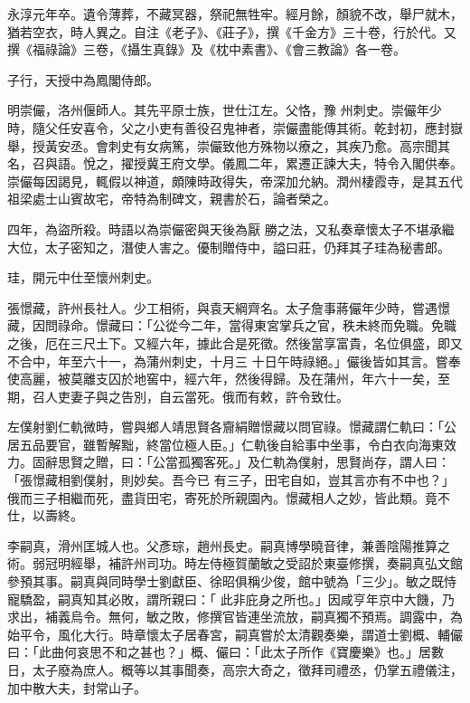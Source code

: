 \begin{pinyinscope}
 永淳元年卒。遺令薄葬，不藏冥器，祭祀無牲牢。經月餘，顏貌不改，舉尸就木，猶若空衣，時人異之。自注《老子》、《莊子》，撰《千金方》三十卷，行於代。又撰《福祿論》三卷，《攝生真錄》及《枕中素書》、《會三教論》各一卷。



 子行，天授中為鳳閣侍郎。



 明崇儼，洛州偃師人。其先平原士族，世仕江左。父恪，豫
 州刺史。崇儼年少時，隨父任安喜令，父之小吏有善役召鬼神者，崇儼盡能傳其術。乾封初，應封嶽舉，授黃安丞。會刺史有女病篤，崇儼致他方殊物以療之，其疾乃愈。高宗聞其名，召與語。悅之，擢授冀王府文學。儀鳳二年，累遷正諫大夫，特令入閣供奉。崇儼每因謁見，輒假以神道，頗陳時政得失，帝深加允納。潤州棲霞寺，是其五代祖梁處士山賓故宅，帝特為制碑文，親書於石，論者榮之。



 四年，為盜所殺。時語以為崇儼密與天後為厭
 勝之法，又私奏章懷太子不堪承繼大位，太子密知之，潛使人害之。優制贈侍中，謚曰莊，仍拜其子珪為秘書郎。



 珪，開元中仕至懷州刺史。



 張憬藏，許州長社人。少工相術，與袁天綱齊名。太子詹事蔣儼年少時，嘗遇憬藏，因問祿命。憬藏曰：「公從今二年，當得東宮掌兵之官，秩未終而免職。免職之後，厄在三尺土下。又經六年，據此合是死徵。然後當享富貴，名位俱盛，即又不合中，年至六十一，為蒲州刺史，十月三
 十日午時祿絕。」儼後皆如其言。嘗奉使高麗，被莫離支囚於地窖中，經六年，然後得歸。及在蒲州，年六十一矣，至期，召人吏妻子與之告別，自云當死。俄而有敕，許令致仕。



 左僕射劉仁軌微時，嘗與鄉人靖思賢各齎絹贈憬藏以問官祿。憬藏謂仁軌曰：「公居五品要官，雖暫解黜，終當位極人臣。」仁軌後自給事中坐事，令白衣向海東效力。固辭思賢之贈，曰：「公當孤獨客死。」及仁軌為僕射，思賢尚存，謂人曰：「張憬藏相劉僕射，則妙矣。吾今已
 有三子，田宅自如，豈其言亦有不中也？」俄而三子相繼而死，盡貨田宅，寄死於所親園內。憬藏相人之妙，皆此類。竟不仕，以壽終。



 李嗣真，滑州匡城人也。父彥琮，趙州長史。嗣真博學曉音律，兼善陰陽推算之術。弱冠明經舉，補許州司功。時左侍極賀蘭敏之受詔於東臺修撰，奏嗣真弘文館參預其事。嗣真與同時學士劉獻臣、徐昭俱稱少俊，館中號為「三少」。敏之既恃寵驕盈，嗣真知其必敗，謂所親曰：「
 此非庇身之所也。」因咸亨年京中大饑，乃求出，補義烏令。無何，敏之敗，修撰官皆連坐流放，嗣真獨不預焉。調露中，為始平令，風化大行。時章懷太子居春宮，嗣真嘗於太清觀奏樂，謂道士劉概、輔儼曰：「此曲何哀思不和之甚也？」概、儼曰：「此太子所作《寶慶樂》也。」居數日，太子廢為庶人。概等以其事聞奏，高宗大奇之，徵拜司禮丞，仍掌五禮儀注，加中散大夫，封常山子。




\end{pinyinscope}
